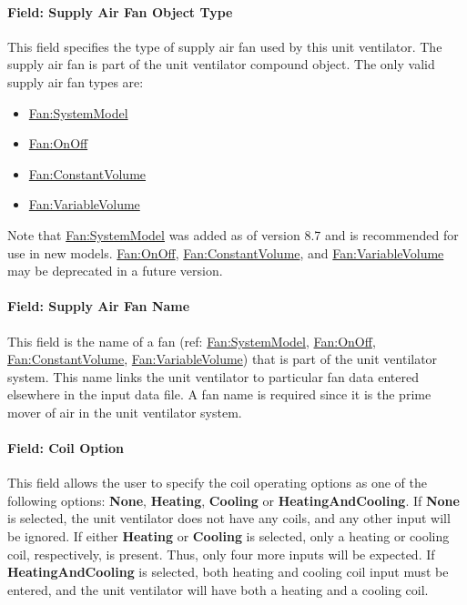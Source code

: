 \paragraph{Field: Supply Air Fan Object Type}\label{field-supply-air-fan-object-type-1-000}

This field specifies the type of supply air fan used by this unit ventilator. The supply air fan is part of the unit ventilator compound object. The only valid supply air fan types are:

\begin{itemize}
\item
  \hyperref[fansystemmodel]{Fan:SystemModel}
\item
  \hyperref[fanonoff]{Fan:OnOff}
\item
  \hyperref[fanconstantvolume]{Fan:ConstantVolume}
\item
  \hyperref[fanvariablevolume]{Fan:VariableVolume}
\end{itemize}

Note that \hyperref[fansystemmodel]{Fan:SystemModel} was added as of version 8.7 and is recommended for use in new models.  \hyperref[fanonoff]{Fan:OnOff}, \hyperref[fanconstantvolume]{Fan:ConstantVolume}, and \hyperref[fanvariablevolume]{Fan:VariableVolume} may be deprecated in a future version.

\paragraph{Field: Supply Air Fan Name}\label{field-supply-air-fan-name-1-000}

This field is the name of a fan (ref: \hyperref[fansystemmodel]{Fan:SystemModel}, \hyperref[fanonoff]{Fan:OnOff}, \hyperref[fanconstantvolume]{Fan:ConstantVolume}, \hyperref[fanvariablevolume]{Fan:VariableVolume}) that is part of the unit ventilator system. This name links the unit ventilator to particular fan data entered elsewhere in the input data file. A fan name is required since it is the prime mover of air in the unit ventilator system.

\paragraph{Field: Coil Option}\label{field-coil-option}

This field allows the user to specify the coil operating options as one of the following options: \textbf{None}, \textbf{Heating}, \textbf{Cooling} or \textbf{HeatingAndCooling}. If \textbf{None} is selected, the unit ventilator does not have any coils, and any other input will be ignored. If either \textbf{Heating} or \textbf{Cooling} is selected, only a heating or cooling coil, respectively, is present. Thus, only four more inputs will be expected. If \textbf{HeatingAndCooling} is selected, both heating and cooling coil input must be entered, and the unit ventilator will have both a heating and a cooling coil.

